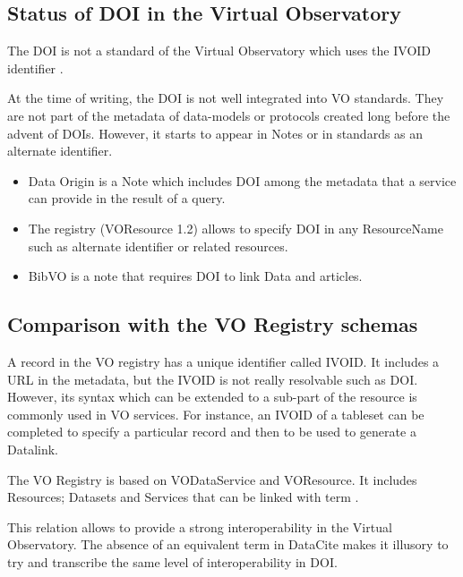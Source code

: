 \documentclass[11pt,a4paper]{ivoa}
\begin{document}
\subsection{Status of DOI in the Virtual Observatory}
The DOI is not a standard of the Virtual Observatory which uses the IVOID identifier \citep{note:ivoid}.

At the time of writing, the DOI is not well integrated into VO standards. They are not part of the metadata of data-models or protocols created long before the advent of DOIs.
However, it starts to appear in Notes or in standards as an alternate identifier.


\begin {itemize}
\item Data Origin \citep{note:dataorigin} is a Note which includes DOI among the metadata that a service can provide in the result of a query.
\item The registry \citep{std:registry} (VOResource 1.2) allows to specify DOI in any ResourceName such as alternate identifier or related resources.
\item BibVO \citep{note:bibvo} is a note that requires DOI to link Data and articles.
\end{itemize}


\subsection{Comparison with the VO Registry schemas}
 A record in the VO registry has a unique identifier called IVOID. It includes a URL in the metadata, but the IVOID is not really resolvable such as DOI. However, its syntax which can be extended to a sub-part of the resource is commonly used in VO services. For instance, an IVOID of a tableset can be completed to specify a particular record and then to be used to generate a Datalink.
 
 The VO Registry is  based on VODataService and VOResource. It includes Resources; Datasets and Services that can be linked with term . 
 
 This relation allows to provide a strong interoperability in the Virtual Observatory. The absence of an equivalent term in DataCite makes it illusory to try and transcribe the same level of interoperability in DOI.\\
 
\end{document}

